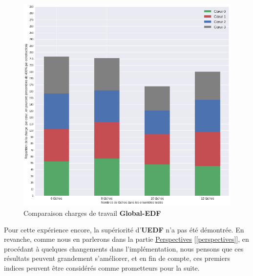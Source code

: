 	\begin{figure}[H]
	\label{loadevolutionGEDF}
	\caption{Comparaison charges de travail \textbf{Global-EDF}}
	\includegraphics[scale=0.5]{img/wcet/repartitiondecharges_gedf}
	\end{figure}		

	Pour cette expérience encore, la supériorité d'\textbf{UEDF} n'a pas été démontrée.
	En revanche, comme nous en parlerons dans la partie \hyperref[contexte]{Perspectives} [\ref*{perspectives}], en procédant à quelques changements dans l'implémentation, 
	nous pensons que ces résultats peuvent grandement s'améliorer, et en fin de compte, ces premiers indices peuvent être 
	considérés comme prometteurs pour la suite.

		
		

	